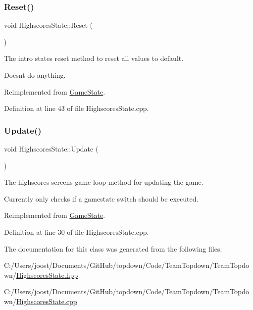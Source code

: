 \subsubsection{\texorpdfstring{Reset()}{Reset()}}
{\footnotesize\ttfamily void Highscores\+State\+::\+Reset (\begin{DoxyParamCaption}{ }\end{DoxyParamCaption})\hspace{0.3cm}{\ttfamily [virtual]}}



The intro state\textquotesingle{}s reset method to reset all values to default. 

Doesn\textquotesingle{}t do anything. 

Reimplemented from \hyperlink{class_game_state_a46ac6317883dff0eba4f8f305af6b6bb}{Game\+State}.



Definition at line 43 of file Highscores\+State.\+cpp.

\mbox{\label{class_highscores_state_a8a55079503b5bdaf205e74eb9d48dae0}} 
\subsubsection{\texorpdfstring{Update()}{Update()}}
{\footnotesize\ttfamily void Highscores\+State\+::\+Update (\begin{DoxyParamCaption}{ }\end{DoxyParamCaption})\hspace{0.3cm}{\ttfamily [virtual]}}



The highscores screen\textquotesingle{}s game loop method for updating the game. 

Currently only checks if a gamestate switch should be executed. 

Reimplemented from \hyperlink{class_game_state_a5be51b634f95bc6e57066ad6931aa18b}{Game\+State}.



Definition at line 30 of file Highscores\+State.\+cpp.



The documentation for this class was generated from the following files\+:\begin{DoxyCompactItemize}
\item 
C\+:/\+Users/joost/\+Documents/\+Git\+Hub/topdown/\+Code/\+Team\+Topdown/\+Team\+Topdown/\hyperlink{_highscores_state_8hpp}{Highscores\+State.\+hpp}\item 
C\+:/\+Users/joost/\+Documents/\+Git\+Hub/topdown/\+Code/\+Team\+Topdown/\+Team\+Topdown/\hyperlink{_highscores_state_8cpp}{Highscores\+State.\+cpp}\end{DoxyCompactItemize}
